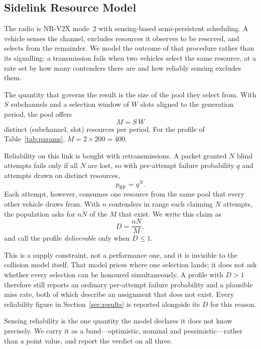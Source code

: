 \subsection{Sidelink Resource Model}
\label{sec:sys:rf}

The radio is NR-V2X mode~2 with sensing-based semi-persistent scheduling. A
vehicle senses the channel, excludes resources it observes to be reserved, and
selects from the remainder. We model the outcome of that procedure rather than
its signalling: a transmission fails when two vehicles select the same
resource, at a rate set by how many contenders there are and how reliably
sensing excludes them.

The quantity that governs the result is the size of the pool they select from.
With $S$ subchannels and a selection window of $W$ slots aligned to the
generation period, the pool offers
\begin{equation}
  M = S \, W
  \label{eq:pool}
\end{equation}
distinct (subchannel, slot) resources per period. For the profile of
Table~\ref{tab:params}, $M = 2 \times 200 = 400$.

Reliability on this link is bought with retransmissions. A packet granted $N$
blind attempts fails only if all $N$ are lost, so with per-attempt failure
probability $q$ and attempts drawn on distinct resources,
\begin{equation}
  p_{\mathrm{RF}} = q^{N}.
  \label{eq:rf}
\end{equation}
Each attempt, however, consumes one resource from the same pool that every
other vehicle draws from. With $n$ contenders in range each claiming $N$
attempts, the population asks for $nN$ of the $M$ that exist. We write this
claim as
\begin{equation}
  D = \frac{nN}{M},
  \label{eq:demand}
\end{equation}
and call the profile \emph{deliverable} only when $D \le 1$.

This is a supply constraint, not a performance one, and it is invisible to the
collision model itself. That model prices where one selection lands; it does
not ask whether every selection can be honoured simultaneously. A profile with
$D > 1$ therefore still reports an ordinary per-attempt failure probability and
a plausible miss rate, both of which describe an assignment that does not
exist. Every reliability figure in Section~\ref{sec:results} is reported
alongside its $D$ for this reason.

Sensing reliability is the one quantity the model declares it does not know
precisely. We carry it as a band---optimistic, nominal and pessimistic---rather
than a point value, and report the verdict on all three.


